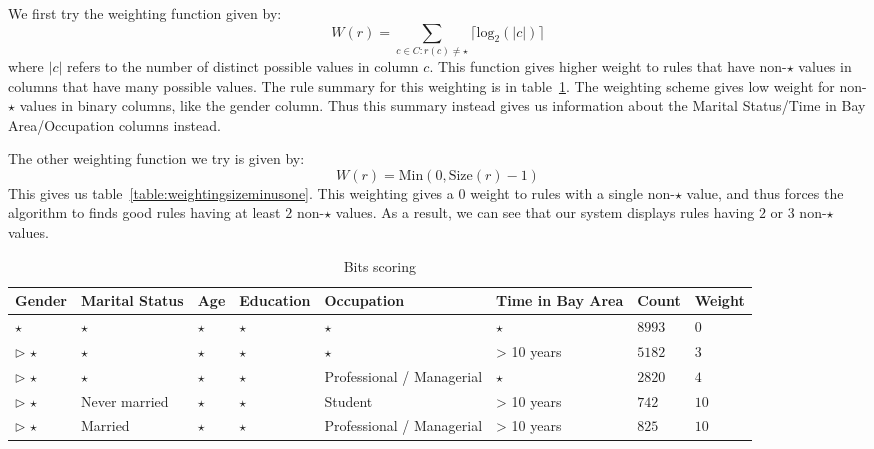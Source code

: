 \documentclass{sig-alternate}
\begin{document}
We first try the weighting function given by:
$$W(r) = \sum_{c \in C : r(c) \neq \star} \lceil \text{log}_2(|c|) \rceil$$ where $|c|$ refers to the number of distinct possible values in column $c$. This function gives higher weight to rules that have non-$\star$ values in columns that have many possible values. The rule summary for this weighting is in table~\ref{table:weigtingbitwise}. The weighting scheme gives low weight for non-$\star$ values in binary columns, like the gender column. Thus this summary instead gives us information about the Marital Status/Time in Bay Area/Occupation columns instead.  

The other weighting function we try is given by:
$$W(r) = \text{Min}(0, \text{Size}(r) - 1)$$
This gives us table~\ref{table:weightingsizeminusone}. This weighting gives a $0$ weight to rules with a single non-$\star$ value, and thus forces the algorithm to finds good rules having at least $2$ non-$\star$ values. As a result, we can see that our system displays rules having $2$ or $3$ non-$\star$ values. 

\begin{table} 
\centering 
\begin{tabular}{| p{1.5cm} | p{1.5cm} | p{1.5cm} | p{1.5cm} | p{1.5cm} | p{1.5cm} | l | l |} 
\hline Gender & Marital Status & Age & Education & Occupation & Time in Bay Area & Count & Weight \\ \hline 
\cline{1-8} $\star$ & $\star$ & $\star$ & $\star$ & $\star$ & $\star$ & $8993$ & $0$ \\
\cline{1-1} \cline{2-2} \cline{3-3} \cline{4-4} \cline{5-5} \cline{6-6} \cline{7-8} $\triangleright$ $\star$ & $\star$ & $\star$ & $\star$ & $\star$ & > 10 years & $5182$ & $3$ \\
\cline{1-1} \cline{2-2} \cline{3-3} \cline{4-4} \cline{5-5} \cline{6-6} \cline{7-8} $\triangleright$ $\star$ & $\star$ & $\star$ & $\star$ & Professional / Managerial & $\star$ & $2820$ & $4$ \\
\cline{1-1} \cline{2-2} \cline{3-3} \cline{4-4} \cline{5-5} \cline{6-6} \cline{7-8} $\triangleright$ $\star$ & Never married & $\star$ & $\star$ & Student & > 10 years & $742$ & $10$ \\
\cline{1-1} \cline{2-2} \cline{3-3} \cline{4-4} \cline{5-5} \cline{6-6} \cline{7-8} $\triangleright$ $\star$ & Married & $\star$ & $\star$ & Professional / Managerial & > 10 years & $825$ & $10$ \\
\hline 
\end{tabular} 
\caption{Bits scoring\label{table:weigtingbitwise}} 
\end{table} 
\end{document}
